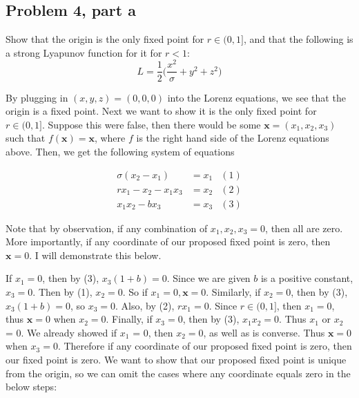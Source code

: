 \subsection{Problem 4, part a}
Show that the origin is the only fixed point for $r \in (0, 1]$, and that the following is a strong Lyapunov function for it for $r < 1$:
\[
L = \frac{1}{2}\Big( \frac{x^2}{\sigma} + y^2 + z^2\Big)
\]
\partbreak
\begin{solution}

    By plugging in $(x, y, z) = (0, 0, 0)$ into the Lorenz equations, we see that the origin is a fixed point. Next we want to show it is the only fixed point for $r \in (0, 1]$. Suppose this were false, then there would be some $\textbf{x} = (x_1, x_2, x_3)$ such that $f(\textbf{x}) = \textbf{x}$, where $f$ is the right hand side of the Lorenz equations above. Then, we get the following system of equations

\begin{align}
    \sigma(x_2 - x_1) &= x_1 &(1)\nonumber\\
    rx_1 - x_2 - x_1x_3 &= x_2 &(2)\nonumber\\
    x_1x_2 - bx_3 &= x_3 &(3) \nonumber
\end{align}

Note that by observation, if any combination of $x_1, x_2, x_3 = 0$, then all are zero. More importantly, if any coordinate of our proposed fixed point is zero, then $\textbf{x} = 0$. I will demonstrate this below.\par

\jump
If $x_1 = 0$, then by (3), $x_3(1 + b) = 0$. Since we are given $b$ is a positive constant, $x_3 = 0$. Then by (1), $x_2 = 0$. So if $x_1 = 0, \textbf{x} = 0$. Similarly, if $x_2 = 0$, then by (3), $x_3(1 + b) = 0$, so $x_3 = 0$. Also, by (2), $rx_1 = 0$. Since $r \in (0, 1]$, then $x_1 = 0$, thus $\textbf{x} = 0$ when $x_2 = 0$. Finally, if $x_3 = 0$, then by (3), $x_1x_2 = 0$. Thus $x_1$ or $x_2$ = 0. We already showed if $x_1$ = 0, then $x_2 = 0$, as well as is converse. Thus $\textbf{x} = 0$ when $x_3 = 0$. Therefore if any coordinate of our proposed fixed point is zero, then our fixed point is zero. We want to show that our proposed fixed point is unique from the origin, so we can omit the cases where any coordinate equals zero in the below steps:


\end{solution}
